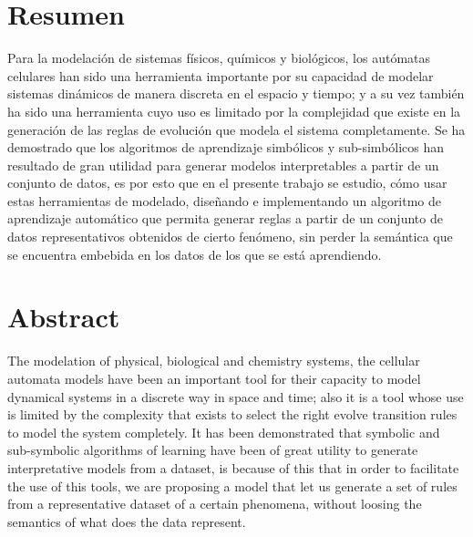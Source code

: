 \pagestyle{plain}
\cleardoublepage
\chapter*{Resumen}
\bigskip
\noindent Para la modelación de sistemas físicos, químicos y biológicos, los autómatas celulares han sido una herramienta importante por su capacidad de modelar sistemas dinámicos de manera discreta en el espacio y tiempo; y a su vez también ha sido una herramienta cuyo uso es limitado por la complejidad que existe en la generación de las reglas de evolución que modela el sistema completamente. Se ha demostrado que los algoritmos de aprendizaje simbólicos y sub-simbólicos han resultado de gran utilidad para generar modelos interpretables a partir de un conjunto de datos, es por esto que en el presente trabajo se estudio, cómo usar estas herramientas de modelado, diseñando e implementando un algoritmo de aprendizaje automático que permita generar reglas a partir de un conjunto de datos representativos obtenidos de cierto fenómeno, sin perder la semántica que se encuentra embebida en los datos de los que se está aprendiendo.

\bigskip
\bigskip
\chapter*{Abstract}
\bigskip
The modelation of physical, biological and chemistry systems, the cellular automata models have been an important tool for their capacity to model dynamical systems in a discrete way in space and time; also it is a tool whose use is limited by the complexity that exists to select the right evolve transition rules to model the system completely. It has been demonstrated that symbolic and sub-symbolic algorithms of learning have been of great utility to generate interpretative models from a dataset, is because of this that in order to facilitate the use of this tools, we are proposing a model that let us generate a set of rules from a representative dataset of a certain phenomena, without loosing the semantics of what does the data represent.
